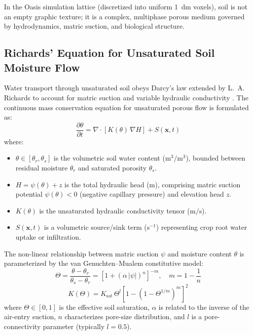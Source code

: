 In the Oasis simulation lattice (discretized into uniform 1~dm voxels), soil is not an empty graphic texture; it is a complex, multiphase porous medium governed by hydrodynamics, matric suction, and biological structure.

\subsection{Richards' Equation for Unsaturated Soil Moisture Flow}
Water transport through unsaturated soil obeys Darcy's law extended by L.~A. Richards to account for matric suction and variable hydraulic conductivity \cite{crank1979mathematics}. The continuous mass conservation equation for unsaturated porous flow is formulated as:
\begin{equation}
\frac{\partial \theta}{\partial t} = \nabla \cdot \left[ K(\theta) \, \nabla H \right] + S(\mathbf{x}, t)
\label{eq:richards_equation}
\end{equation}
where:
\begin{itemize}
    \item $\theta \in [\theta_r, \theta_s]$ is the volumetric soil water content ($\mathrm{m^3/m^3}$), bounded between residual moisture $\theta_r$ and saturated porosity $\theta_s$.
    \item $H = \psi(\theta) + z$ is the total hydraulic head ($\mathrm{m}$), comprising matric suction potential $\psi(\theta) < 0$ (negative capillary pressure) and elevation head $z$.
    \item $K(\theta)$ is the unsaturated hydraulic conductivity tensor ($\mathrm{m/s}$).
    \item $S(\mathbf{x}, t)$ is a volumetric source/sink term ($\mathrm{s^{-1}}$) representing crop root water uptake or infiltration.
\end{itemize}

The non-linear relationship between matric suction $\psi$ and moisture content $\theta$ is parameterized by the van Genuchten--Mualem constitutive model:
\begin{equation}
\Theta = \frac{\theta - \theta_r}{\theta_s - \theta_r} = \left[ 1 + (\alpha \, |\psi|)^n \right]^{-m}, \quad m = 1 - \frac{1}{n}
\label{eq:van_genuchten_swrc}
\end{equation}
\begin{equation}
K(\Theta) = K_{\mathrm{sat}} \, \Theta^l \left[ 1 - \left( 1 - \Theta^{1/m} \right)^m \right]^2
\label{eq:mualem_conductivity}
\end{equation}
where $\Theta \in [0, 1]$ is the effective soil saturation, $\alpha$ is related to the inverse of the air-entry suction, $n$ characterizes pore-size distribution, and $l$ is a pore-connectivity parameter (typically $l = 0.5$).

